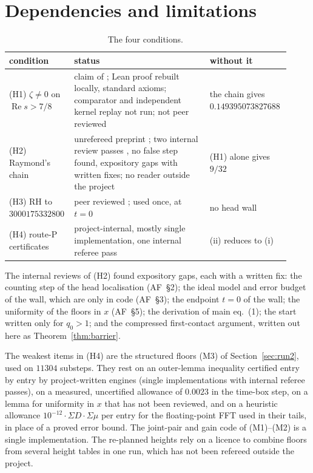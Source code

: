 \documentclass[11pt]{article}
\theoremstyle{definition}
\DeclareMathOperator{\Rea}{Re}
\begin{document}
\section{Dependencies and limitations}\label{sec:limitations}

\begin{table}[ht]
\centering
\small
\begin{tabular}{@{}>{\raggedright\arraybackslash}p{0.2\linewidth}>{\raggedright\arraybackslash}p{0.47\linewidth}>{\raggedright\arraybackslash}p{0.25\linewidth}@{}}
\toprule
condition & status & without it\\
\midrule
(H1) $\zeta\ne0$ on $\Rea s>7/8$ & claim of \cite{OpenAI26QRH}; Lean proof rebuilt locally, standard axioms; comparator and independent kernel replay not run; not peer reviewed & the chain gives $0.149395073827688$\\
(H2) Raymond's chain & unrefereed preprint \cite{Raymond26}; two internal review passes \cite{IntReviewA,IntReviewB}, no false step found, expository gaps with written fixes; no reader outside the project & (H1) alone gives $9/32$\\
(H3) RH to $3000175332800$ & peer reviewed \cite{PlattTrudgian21}; used once, at $t=0$ & no head wall\\
(H4) route-P certificates & project-internal, mostly single implementation, one internal referee pass & (ii) reduces to (i)\\
\bottomrule
\end{tabular}
\caption{The four conditions.}
\label{tab:deps}
\end{table}

The internal reviews of (H2) found expository gaps, each with a written fix: the counting
step of the head localisation (AF~\S2); the ideal model and error budget of the wall, which
are only in code (AF~\S3); the endpoint $t=0$ of the wall; the uniformity of the floors in
$x$ (AF~\S5); the derivation of main eq.~(1); the start written only for $q_0>1$; and the
compressed first-contact argument, written out here as Theorem~\ref{thm:barrier}.

The weakest items in (H4) are the structured floors (M3) of Section~\ref{sec:run2}, used on
$11304$ substeps. They rest on an outer-lemma inequality certified entry by entry by
project-written engines (single implementations with internal referee passes), on a measured, uncertified allowance of $0.0023$ in the time-box step, on a lemma for
uniformity in $x$ that has not been reviewed, and on a heuristic allowance
$10^{-12}\cdot\Sigma D\cdot\Sigma\mu$ per entry for the floating-point FFT used in their
tails, in place of a proved error bound. The joint-pair and gain code of (M1)--(M2) is a single implementation.
The re-planned heights rely on a licence to combine floors from several height tables in one
run, which has not been refereed outside the project.
\end{document}
